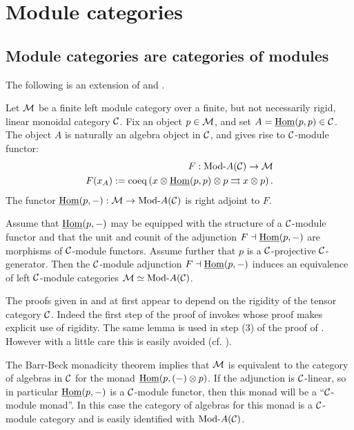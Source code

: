\documentclass{amsart}
\begin{document}
\section{Module categories}

\subsection{Module categories are categories of modules}

The following is an extension of \cite[Thm 2.11.2]{EGNO} and \cite[Thm 1]{MR1976459}.

\begin{theorem} \label{thm:C-module-Embedding} %
	Let $\mathcal M$ be a finite left module category over a finite, but not necessarily rigid, linear monoidal category $\mathcal C$. Fix an object $p \in \mathcal M$, and set $A = \operatorname{\underline{Hom}}(p,p) \in \mathcal C$. The object $A$ is naturally an algebra object in $\mathcal C$, and gives rise to $\mathcal C$-module functor:
	\begin{align*}
		F:   \Mod{}{A}(\cC) \to \cM \\
		F(x_A) := \coeq \left( x \otimes \IHom(p,p) \otimes p \rightrightarrows x \otimes p \right).
	\end{align*}
The functor $\IHom(p,-): \cM \to \Mod{}{A}(\cC)$ is right adjoint to $F$. 

Assume that $\operatorname{\underline{Hom}}(p,-)$ may be equipped with the structure of a $\mathcal C$-module functor and that the unit and counit of the adjunction $F \dashv \operatorname{\underline{Hom}}(p,-)$ are morphisms of $\mathcal C$-module functors. Assume further that $p$ is a $\mathcal C$-projective $\mathcal C$-generator.  Then the $\mathcal C$-module adjunction  $F \dashv \operatorname{\underline{Hom}}(p,-)$
	induces an equivalence of left $\mathcal C$-module categories $\cM \simeq \Mod{}{A}(\cC)$. 
\end{theorem}

\noindent The proofs given in \cite{EGNO} and \cite{MR1976459} at first appear to depend on  the rigidity of the tensor category $\mathcal C$. Indeed the first step of the proof of \cite[Thm 2.11.2]{EGNO} invokes \cite[lemma 2.10.4.(4)]{EGNO} whose proof makes explicit use of rigidity. The same lemma is used in step (3) of the proof of \cite[Thm 1]{MR1976459}. However with a little care this is easily avoided (cf. \cite[Rmk. 2.11.3]{EGNO}). 

The Barr-Beck monadicity theorem implies that $\mathcal M$ is equivalent to the category of algebras in $\mathcal C$ for the monad $\operatorname{\underline{Hom}}(p, (-) \otimes p)$. If the adjunction is $\mathcal C$-linear, so in particular $\operatorname{\underline{Hom}}(p,-)$ is a $\mathcal C$-module functor, then this monad will be a ``$\mathcal C$-module monad''. In this case the category of algebras for this monad is a $\mathcal C$-module category and is easily identified with $\Mod{}{A}(\cC)$. 
\end{document}
